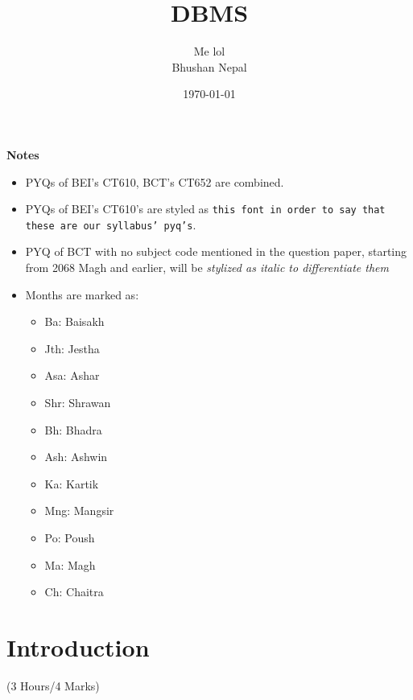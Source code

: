 \documentclass[12pt]{article}
\title{DBMS}
\author{Me lol\\Bhushan Nepal}
\date{\today}
\begin{document}
\maketitle
\vspace{8cm}
\begin{large}\textbf{Notes}\end{large}
\begin{itemize}
\item PYQs of BEI's CT610, BCT's CT652 are combined.
\item PYQs of BEI's CT610's are styled as \texttt{this font in order to say that these are our syllabus' pyq's}.
\item PYQ of BCT with no subject code mentioned in the question paper, starting from 2068 Magh and earlier, will be \textit{stylized as italic to differentiate them}
\item Months are marked as: 
\begin{itemize}[noitemsep]
	\item Ba: Baisakh
	\item Jth: Jestha
	\item Asa: Ashar
	\item Shr: Shrawan
	\item Bh: Bhadra
	\item Ash: Ashwin
	\item Ka: Kartik
	\item Mng: Mangsir
	\item Po: Poush
	\item Ma: Magh
	\item Ch: Chaitra
\end{itemize}
\end{itemize}

\pagebreak
\tableofcontents
\pagebreak

\section{Introduction}
    \begin{center}(3 Hours/4 Marks)\end{center}
\end{document}
